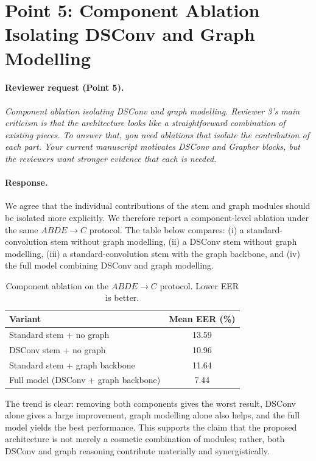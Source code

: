 \documentclass[11pt]{article}
\begin{document}
\section*{Point 5: Component Ablation Isolating DSConv and Graph Modelling}

\paragraph{Reviewer request (Point 5).}
\emph{Component ablation isolating DSConv and graph modelling. Reviewer 3's main criticism is that the architecture looks like a straightforward combination of existing pieces. To answer that, you need ablations that isolate the contribution of each part. Your current manuscript motivates DSConv and Grapher blocks, but the reviewers want stronger evidence that each is needed.}

\paragraph{Response.}
We agree that the individual contributions of the stem and graph modules should be isolated more explicitly. We therefore report a component-level ablation under the same $ABDE \rightarrow C$ protocol. The table below compares: (i) a standard-convolution stem without graph modelling, (ii) a DSConv stem without graph modelling, (iii) a standard-convolution stem with the graph backbone, and (iv) the full model combining DSConv and graph modelling.

\begin{table}[ht!]
    \centering
    \begin{tabular}{|l|c|}
        \hline
        Variant & Mean EER (\%) \\
        \hline
        Standard stem + no graph & 13.59 \\
        DSConv stem + no graph & 10.96 \\
        Standard stem + graph backbone & 11.64 \\
        Full model (DSConv + graph backbone) & 7.44 \\
        \hline
    \end{tabular}
    \caption{Component ablation on the $ABDE \rightarrow C$ protocol. Lower EER is better.}
    \label{tab:rebuttal_component_ablation}
\end{table}

The trend is clear: removing both components gives the worst result, DSConv alone gives a large improvement, graph modelling alone also helps, and the full model yields the best performance. This supports the claim that the proposed architecture is not merely a cosmetic combination of modules; rather, both DSConv and graph reasoning contribute materially and synergistically.
\end{document}
